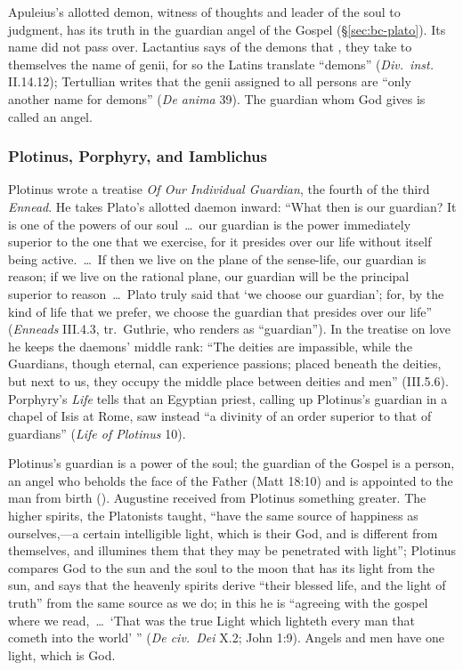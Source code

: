 Apuleius's allotted demon, witness of thoughts and leader of the soul to
judgment, has its truth in the guardian angel of the Gospel
(\S\ref{sec:bc-plato}). Its name did not pass over. Lactantius says of
the demons that , they take to themselves the name of
genii, for so the Latins translate ``demons'' (\emph{Div.\ inst.}
II.14.12); Tertullian writes that the genii assigned to all persons are
``only another name for demons'' (\emph{De anima} 39). The guardian whom God gives is called an angel.

\subsubsection{Plotinus, Porphyry, and Iamblichus}\label{sec:bc-neoplatonists}

Plotinus wrote a treatise \emph{Of Our Individual Guardian}, the fourth
of the third \emph{Ennead}. He takes Plato's allotted daemon inward: ``What then is
our guardian? It is one of the powers of our soul~\dots\ our guardian
is the power immediately superior to the one that we exercise, for it
presides over our life without itself being active.~\dots\ If then we
live on the plane of the sense-life, our guardian is reason; if we live
on the rational plane, our guardian will be the principal superior to
reason~\dots\ Plato truly said that `we choose our guardian'; for, by
the kind of life that we prefer, we choose the guardian that presides
over our life'' (\emph{Enneads} III.4.3, tr.\ Guthrie, who renders
 as ``guardian''). In the treatise on love he keeps the
daemons' middle rank: ``The deities are impassible, while the Guardians,
though eternal, can experience passions; placed beneath the deities, but
next to us, they occupy the middle place between deities and men''
(III.5.6). Porphyry's \emph{Life} tells that an Egyptian priest, calling
up Plotinus's guardian in a chapel of Isis at Rome, saw instead ``a
divinity of an order superior to that of guardians'' (\emph{Life of
Plotinus} 10).

Plotinus's guardian is a power of the soul; the guardian of the Gospel
is a person, an angel who beholds the face of the Father (Matt 18:10)
and is appointed to the man from birth ().
Augustine received from Plotinus
something greater. The higher spirits, the Platonists taught, ``have
the same source of happiness as ourselves,---a certain intelligible
light, which is their God, and is different from themselves, and
illumines them that they may be penetrated with light''; Plotinus
compares God to the sun and the soul to the moon that has its light from
the sun, and says that the heavenly spirits derive ``their blessed life,
and the light of truth'' from the same source as we do; in this he is
``agreeing with the gospel where we read,~\dots\ `That was the true
Light which lighteth every man that cometh into the world' ''
(\emph{De civ.\ Dei} X.2; John 1:9). Angels and men have one light,
which is God.

